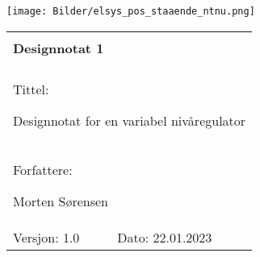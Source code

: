\topmargin -1.5cm
\begin{minipage}[c]{0.15\textwidth}
\texttt{[image: Bilder/elsys\_pos\_staaende\_ntnu.png]}  
\end{minipage}
\begin{minipage}[c]{0.85\textwidth}

\renewcommand{\arraystretch}{1.7}
\large 
\begin{tabularx}{\textwidth}{|X|X|}
\hline
\multicolumn{2}{|l|}{} \\
\multicolumn{2}{|l|}{\huge \textbf{Designnotat 1}} \\
\multicolumn{2}{|l|}{}  \\
\hline
\multicolumn{2}{|l|}{Tittel: 

Designnotat for en variabel nivåregulator
} \\
\hline
\multicolumn{2}{|l|}{Forfattere: 

Morten Sørensen
} \\
\hline

Versjon: 1.0 & Dato: 22.01.2023
\\
\hline 
\end{tabularx}
\end{minipage}
\normalsize
